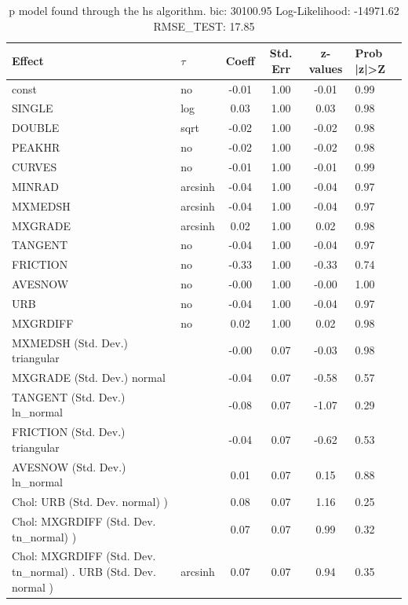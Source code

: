 \begin{table}
	\caption{p model found through the hs algorithm. bic: 30100.95 Log-Likelihood: -14971.62 RMSE_TEST: 17.85}
	\begin{center}
		\begin{tabular}{|l|l|c|c|c|l|}
			\hline
			Effect & $\tau$ & Coeff & Std. Err & z-values & Prob |z|>Z \\
			\hline
			const & no & -0.01 & 1.00 & -0.01 & 0.99 \\
			\hline
			SINGLE & log & 0.03 & 1.00 & 0.03 & 0.98 \\
			\hline
			DOUBLE & sqrt & -0.02 & 1.00 & -0.02 & 0.98 \\
			\hline
			PEAKHR & no & -0.02 & 1.00 & -0.02 & 0.98 \\
			\hline
			CURVES & no & -0.01 & 1.00 & -0.01 & 0.99 \\
			\hline
			MINRAD & arcsinh & -0.04 & 1.00 & -0.04 & 0.97 \\
			\hline
			MXMEDSH & arcsinh & -0.04 & 1.00 & -0.04 & 0.97 \\
			\hline
			MXGRADE & arcsinh & 0.02 & 1.00 & 0.02 & 0.98 \\
			\hline
			TANGENT & no & -0.04 & 1.00 & -0.04 & 0.97 \\
			\hline
			FRICTION & no & -0.33 & 1.00 & -0.33 & 0.74 \\
			\hline
			AVESNOW & no & -0.00 & 1.00 & -0.00 & 1.00 \\
			\hline
			URB & no & -0.04 & 1.00 & -0.04 & 0.97 \\
			\hline
			MXGRDIFF & no & 0.02 & 1.00 & 0.02 & 0.98 \\
			\hline
			MXMEDSH (Std. Dev.) triangular &  & -0.00 & 0.07 & -0.03 & 0.98 \\
			\hline
			MXGRADE (Std. Dev.) normal &  & -0.04 & 0.07 & -0.58 & 0.57 \\
			\hline
			TANGENT (Std. Dev.) ln_normal &  & -0.08 & 0.07 & -1.07 & 0.29 \\
			\hline
			FRICTION (Std. Dev.) triangular &  & -0.04 & 0.07 & -0.62 & 0.53 \\
			\hline
			AVESNOW (Std. Dev.) ln_normal &  & 0.01 & 0.07 & 0.15 & 0.88 \\
			\hline
			 Chol: URB (Std. Dev. normal) ) &  & 0.08 & 0.07 & 1.16 & 0.25 \\
			\hline
			 Chol: MXGRDIFF (Std. Dev. tn_normal) ) &  & 0.07 & 0.07 & 0.99 & 0.32 \\
			\hline
			 Chol: MXGRDIFF (Std. Dev. tn_normal) . URB (Std. Dev.   normal ) & arcsinh & 0.07 & 0.07 & 0.94 & 0.35 \\

\end{tabular}
\end{center}
\end{table}
